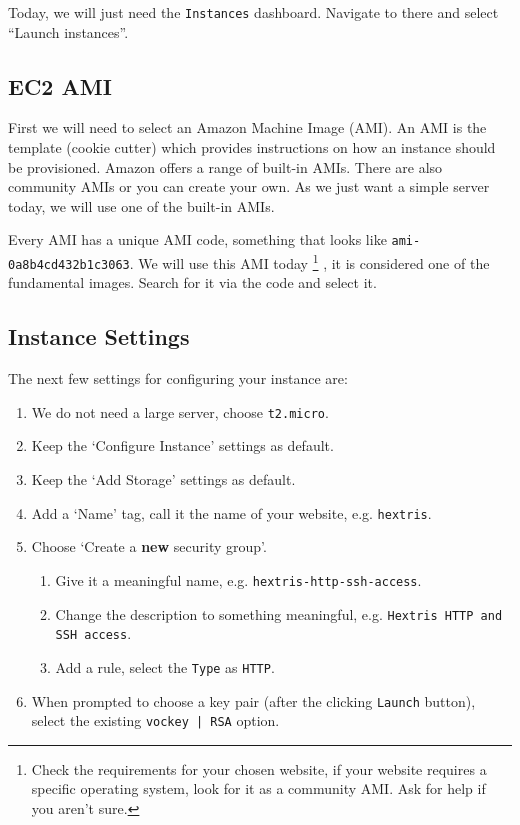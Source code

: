 \documentclass{csse4400}
\begin{document}
Today, we will just need the \texttt{Instances} dashboard.
Navigate to there and select ``Launch instances''.

\subsection{EC2 AMI}
First we will need to select an Amazon Machine Image (AMI).
An AMI is the template (cookie cutter) which provides instructions on how an instance should be provisioned.
Amazon offers a range of built-in AMIs. There are also community AMIs or you can create your own.
As we just want a simple server today, we will use one of the built-in AMIs.

Every AMI has a unique AMI code, something that looks like \texttt{ami-0a8b4cd432b1c3063}.
We will use this AMI today%
\footnote{Check the requirements for your chosen website, if your website requires a specific operating system, look for it as a community AMI.
Ask for help if you aren't sure.}
, it is considered one of the fundamental images.
Search for it via the code and select it.


\subsection{Instance Settings}
The next few settings for configuring your instance are:
\begin{enumerate}
\item We do not need a large server, choose \texttt{t2.micro}.
\item Keep the `Configure Instance' settings as default.
\item Keep the `Add Storage' settings as default.
\item Add a `Name' tag, call it the name of your website, e.g. \texttt{hextris}.
\item Choose `Create a \textbf{new} security group'.
\begin{enumerate}
\item Give it a meaningful name, e.g. \texttt{hextris-http-ssh-access}.
\item Change the description to something meaningful, e.g. \texttt{Hextris HTTP and SSH access}.
\item Add a rule, select the \texttt{Type} as \texttt{HTTP}.
\end{enumerate}
\item When prompted to choose a key pair (after the clicking \texttt{Launch} button), select the existing \texttt{vockey | RSA} option.
\end{enumerate}
\end{document}
